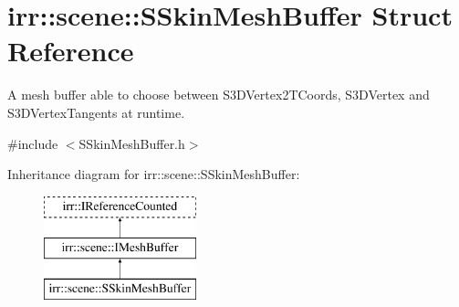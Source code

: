\hypertarget{structirr_1_1scene_1_1SSkinMeshBuffer}{}\section{irr\+:\+:scene\+:\+:S\+Skin\+Mesh\+Buffer Struct Reference}
\label{structirr_1_1scene_1_1SSkinMeshBuffer}


A mesh buffer able to choose between S3\+D\+Vertex2\+T\+Coords, S3\+D\+Vertex and S3\+D\+Vertex\+Tangents at runtime.  




{\ttfamily \#include $<$S\+Skin\+Mesh\+Buffer.\+h$>$}

Inheritance diagram for irr\+:\+:scene\+:\+:S\+Skin\+Mesh\+Buffer\+:\begin{figure}[H]
\begin{center}
\leavevmode
\includegraphics[height=3.000000cm]{structirr_1_1scene_1_1SSkinMeshBuffer}
\end{center}
\end{figure}
